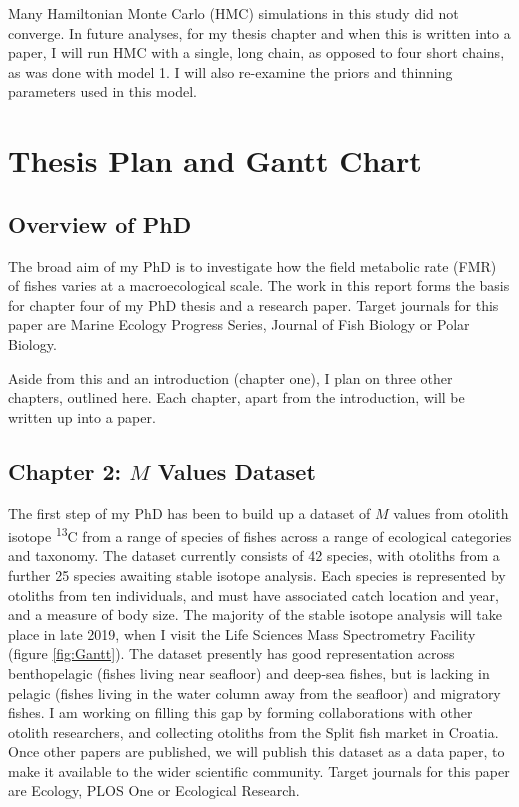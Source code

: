 \documentclass[12pt, titlepage]{article}
\begin{document}
Many Hamiltonian Monte Carlo (HMC) simulations in this study did not converge.
In future analyses, for my thesis chapter and when this is written into a paper, I will run HMC with a single, long chain, as opposed to four short chains, as was done with model 1.
I will also re-examine the priors and thinning parameters used in this model.

\pagebreak
\section{Thesis Plan and Gantt Chart}

\subsection{Overview of PhD}

The broad aim of my PhD is to investigate how the field metabolic rate (FMR) of fishes varies at a macroecological scale. 
The work in this report forms the basis for chapter four of my PhD thesis and a research paper.
Target journals for this paper are Marine Ecology Progress Series, Journal of Fish Biology or Polar Biology.

Aside from this and an introduction (chapter one), I plan on three other chapters, outlined here.
Each chapter, apart from the introduction, will be written up into a paper.

\subsection{Chapter 2: $M$ Values Dataset}
\label{sec:Data}

The first step of my PhD has been to build up a dataset of $M$ values from otolith isotope \textdelta \textsuperscript{13}C from a range of species of fishes across a range of ecological categories and taxonomy.
The dataset currently consists of 42 species, with otoliths from a further 25 species awaiting stable isotope analysis.
Each species is represented by otoliths from ten individuals, and must have associated catch location and year, and a measure of body size.
The majority of the stable isotope analysis will take place in late 2019, when I visit the Life Sciences Mass Spectrometry Facility (figure \ref{fig:Gantt}).
The dataset presently has good representation across benthopelagic (fishes living near seafloor) and deep-sea fishes, but is lacking in pelagic (fishes living in the water column away from the seafloor) and migratory fishes.
I am working on filling this gap by forming collaborations with other otolith researchers, and collecting otoliths from the Split fish market in Croatia.
Once other papers are published, we will publish this dataset as a data paper, to make it available to the wider scientific community.
Target journals for this paper are Ecology, PLOS One or Ecological Research.
\end{document}

